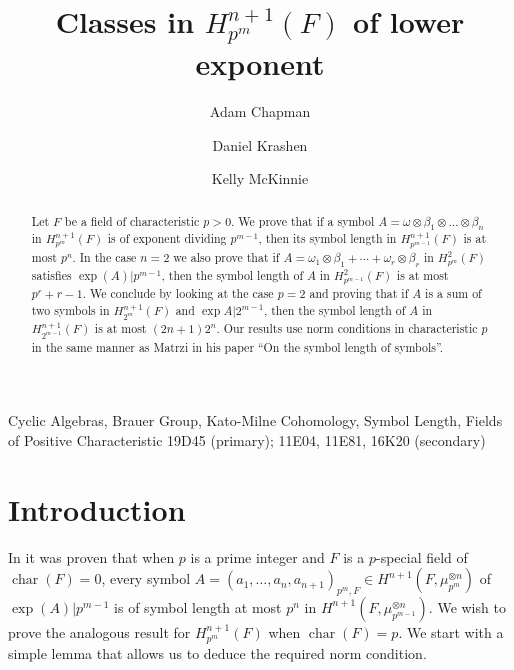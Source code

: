 \documentclass[preprint, 10pt, english]{elsarticle}
\theoremstyle{definition}
\begin{document}
\begin{frontmatter}

\title{Classes in $H_{p^m}^{n+1}(F)$ of lower exponent}


\author{Adam Chapman}
\address{School of Computer Science, Academic College of Tel-Aviv-Yaffo, Rabenu Yeruham St., P.O.B 8401 Yaffo, 6818211, Israel}

\author{Daniel Krashen}
\address{Department of Mathematics, University of Pennsylvania, Philadelphia, Pennsylvania}

\author{Kelly McKinnie}
\address{Department of Mathematical Sciences, University of Montana, Missoula, MT 59812, USA}


\begin{abstract}
Let $F$ be a field of characteristic $p>0$. We prove that if a symbol $A=\omega \otimes \beta_1 \otimes \dots \otimes \beta_n$ in $H_{p^m}^{n+1}(F)$ is of exponent dividing $p^{m-1}$, then its symbol length in $H_{p^{m-1}}^{n+1}(F)$ is at most $p^n$. In the case $n=2$ we also prove that if $A= \omega_1\otimes \beta_1+\cdots+\omega_r\otimes \beta_r$ in $H_{p^{m}}^2(F)$
satisfies $\exp(A)|p^{m-1}$, then the symbol length of $A$ in $H_{p^{m-1}}^2(F)$ is at most $p^r+r-1$. We conclude by looking at the case $p=2$ and proving that if $A$ is a sum of two symbols in $H_{2^m}^{n+1}(F)$ and $\exp A |2^{m-1}$, then the symbol length of $A$ in $H_{2^{m-1}}^{n+1}(F)$ is at most $(2n+1)2^n$. Our results use norm conditions in characteristic $p$ in the same manner as Matrzi in his paper ``On the symbol length of symbols''.%

\end{abstract}

\begin{keyword}
Cyclic Algebras, Brauer Group, Kato-Milne Cohomology, Symbol Length, Fields of Positive Characteristic
\MSC[2020] 19D45 (primary); 11E04, 11E81, 16K20 (secondary)
\end{keyword}
\end{frontmatter}

\section{Introduction}

In \cite{Matzri:2024} it was proven that when $p$ is a prime integer and $F$ is a $p$-special field of $\operatorname{char}(F)=0$, every symbol $A=(a_1,\dots,a_n,a_{n+1})_{p^m,F} \in H^{n+1}(F,\mu_{p^m}^{\otimes n})$ of $\exp(A) | p^{m-1}$ is of symbol length at most $p^n$ in $H^{n+1}(F,\mu_{p^{m-1}}^{\otimes n})$. We wish to prove the analogous result for $H^{n+1}_{p^m}(F)$ when $\operatorname{char}(F)=p$. We start with a simple lemma that allows us to deduce the required norm condition. 
\end{document}
